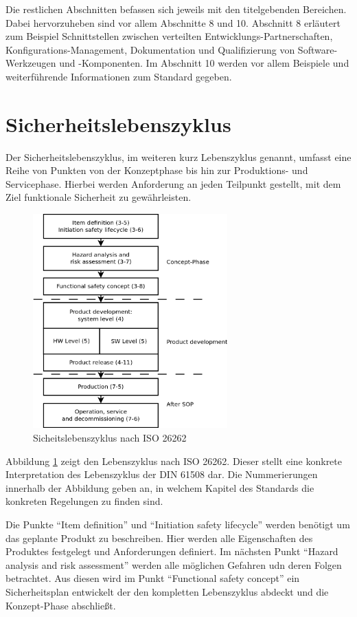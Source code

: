 \documentclass[a4paper,DIV=calc,ngerman]{scrartcl}
\begin{document}
Die restlichen Abschnitten befassen sich jeweils mit den titelgebenden Bereichen. Dabei hervorzuheben sind vor allem Abschnitte 8 und 10. Abschnitt 8 erläutert zum Beispiel Schnittstellen zwischen verteilten Entwicklungs-Partnerschaften, Konfigurations-Management, Dokumentation und Qualifizierung von Software-Werkzeugen und -Komponenten. Im Abschnitt 10 werden vor allem Beispiele und weiterführende Informationen zum Standard gegeben.


\section{Sicherheitslebenszyklus}
\label{sec:Sicherheitslebenszyklus}
Der Sicherheitslebenszyklus, im weiteren kurz Lebenszyklus genannt, umfasst eine Reihe von Punkten von der Konzeptphase bis hin zur Produktions- und Servicephase. Hierbei werden Anforderung an jeden Teilpunkt gestellt, mit dem Ziel funktionale Sicherheit zu gewährleisten.

\begin{figure}
\includegraphics[width=7.5cm]{Abb_6_1}
\caption{Sicheitslebenszyklus nach ISO 26262\cite{1}}
\label{fig:lifecycle}
\end{figure}

Abbildung \ref{fig:lifecycle} zeigt den Lebenszyklus nach ISO 26262. Dieser stellt eine konkrete Interpretation des Lebenszyklus der DIN 61508 dar. Die Nummerierungen innerhalb der Abbildung geben an, in welchem Kapitel des Standards die konkreten Regelungen zu finden sind. 

Die Punkte "`Item definition"' und "`Initiation safety lifecycle"' werden benötigt um das geplante Produkt zu beschreiben. Hier werden alle Eigenschaften des Produktes festgelegt und Anforderungen definiert. Im nächsten Punkt "`Hazard analysis and risk assessment"' werden alle möglichen Gefahren udn deren Folgen betrachtet. Aus diesen wird im Punkt "`Functional safety concept"' ein Sicherheitsplan entwickelt der den kompletten Lebenszyklus abdeckt und die Konzept-Phase abschließt. 
\end{document}
